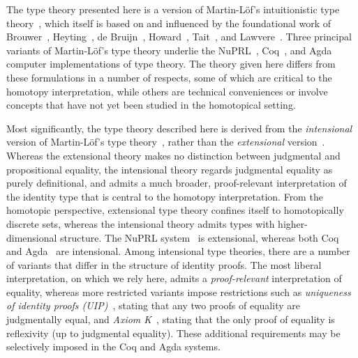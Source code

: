 \sectionNotes
The type theory presented here is a version of Martin-L\"{o}f's intuitionistic type theory~\cite{martinlof71itt,Martin-Lof-1972,Martin-Lof-1973,Martin-Lof-1979,martin-lof:bibliopolis}, which itself is based on and influenced by the foundational work of Brouwer~\cite{brouwer}, Heyting~\cite{heyting}, de Bruijn~\cite{debruijn}, Howard~\cite{howard}, Tait~\cite{tait}, and Lawvere~\cite{lawvere}.  Three principal variants of Martin-L\"{o}f's type theory underlie the NuPRL~\cite{constable+86nuprl-book}, Coq~\cite{Coq}, and Agda~\cite{norell2007towards} computer implementations of type theory.  The theory given here differs from these formulations in a number of respects, some of which are critical to the homotopy interpretation, while others are technical conveniences or involve concepts that have not yet been studied in the homotopical setting.

Most significantly, the type theory described here is derived from the \emph{intensional} version of Martin-L\"{o}f's type theory~\cite{Martin-Lof-1973}, rather than the \emph{extensional} version~\cite{Martin-Lof-1979}.  Whereas the extensional theory makes no distinction between judgmental and propositional equality, the intensional theory regards judgmental equality as purely definitional, and admits a much broader, proof-relevant interpretation of the identity type that is central to the homotopy interpretation.  From the homotopic perspective, extensional type theory confines itself to homotopically discrete sets, whereas the intensional theory admits types with higher-dimensional structure.  The NuPRL system~\cite{constable+86nuprl-book} is extensional, whereas both Coq~\cite{Coq} and Agda~\cite{norell2007towards} are intensional.  Among intensional type theories, there are a number of variants that differ in the structure of identity proofs.  The most liberal interpretation, on which we rely here, admits a \emph{proof-relevant} interpretation of equality, whereas more restricted variants impose restrictions such as \emph{uniqueness of identity proofs (UIP)}~\cite{hofmann}, stating that any two proofs of equality are judgmentally equal, and \emph{Axiom K}~\cite{streicher}, stating that the only proof of equality is reflexivity (up to judgmental equality).  These additional requirements may be selectively imposed in the Coq and Agda systems.


